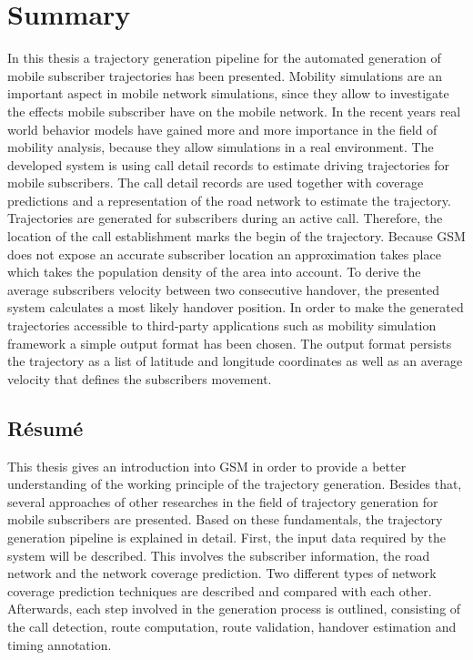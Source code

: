 \documentclass[master,english]{hgbthesis}
\begin{document}
\chapter{Summary}
In this thesis a trajectory generation pipeline for the automated generation of mobile subscriber trajectories has been presented. Mobility simulations are an important aspect in mobile network simulations, since they allow to investigate the effects mobile subscriber have on the mobile network. In the recent years real world behavior models have gained more and more importance in the field of mobility analysis, because they allow simulations in a real environment.
The developed system is using call detail records to estimate driving trajectories for mobile subscribers. The call detail records are used together with coverage predictions and a representation of the road network to estimate the trajectory.
Trajectories are generated for subscribers during an active call. Therefore, the location of the call establishment marks the begin of the trajectory. Because GSM does not expose an accurate subscriber location an approximation takes place which takes the population density of the area into account.
To derive the average subscribers velocity between two consecutive handover, the presented system calculates a most likely handover position. In order to make the generated trajectories accessible to third-party applications such as mobility simulation framework a simple output format has been chosen. The output format persists the trajectory as a list of latitude and longitude coordinates as well as an average velocity that defines the subscribers movement.
\section{Résumé}
This thesis gives an introduction into GSM in order to provide a better understanding of the working principle of the trajectory generation. Besides that, several approaches of other researches in the field of trajectory generation for mobile subscribers are presented.
Based on these fundamentals, the trajectory generation pipeline is explained in detail. First, the input data required by the system will be described. This involves the subscriber information, the road network and the network coverage prediction. Two different types of network coverage prediction techniques are described and compared with each other. Afterwards, each step involved in the generation process is outlined, consisting of the call detection, route computation, route validation, handover estimation and timing annotation.   
\end{document}
